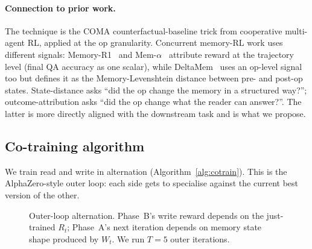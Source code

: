 \documentclass[11pt]{article}
\begin{document}
\paragraph{Connection to prior work.} The technique is the COMA
counterfactual-baseline trick \cite{foerster2018coma} from cooperative
multi-agent RL, applied at the op granularity. Concurrent memory-RL
work uses different signals: Memory-R1~\cite{memoryR1} and
Mem-$\alpha$~\cite{memalpha2025} attribute reward at the trajectory
level (final QA accuracy as one scalar), while
DeltaMem~\cite{deltamem2026} uses an op-level signal too but defines
it as the Memory-Levenshtein distance between pre- and post-op
states. State-distance asks ``did the op change the memory in a
structured way?''; outcome-attribution asks ``did the op change what
the reader can answer?''. The latter is more directly aligned with
the downstream task and is what we propose.

\subsection{Co-training algorithm}

We train read and write in alternation (Algorithm~\ref{alg:cotrain}).
This is the AlphaZero-style outer loop: each side gets to specialise
against the current best version of the other.

\begin{figure}[h]
\centering
{}
\caption{Outer-loop alternation. Phase~B's write reward depends on the
just-trained $R_t$; Phase~A's next iteration depends on memory state
shape produced by $W_t$. We run $T = 5$ outer iterations.}
\label{fig:cotrain}
\end{figure}
\end{document}
